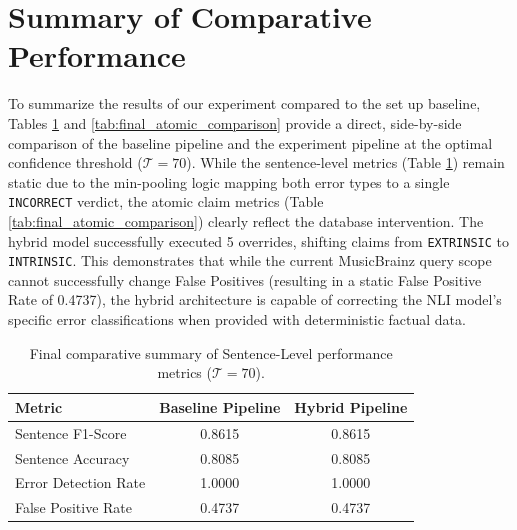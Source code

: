 \section{Summary of Comparative Performance}
To summarize the results of our experiment compared to the set up baseline, Tables \ref{tab:final_sentence_comparison} and \ref{tab:final_atomic_comparison} provide a direct, side-by-side comparison of the baseline pipeline and the experiment pipeline at the optimal confidence threshold ($\mathcal{T} = 70$). While the sentence-level metrics (Table \ref{tab:final_sentence_comparison}) remain static due to the min-pooling logic mapping both error types to a single \texttt{INCORRECT} verdict, the atomic claim metrics (Table \ref{tab:final_atomic_comparison}) clearly reflect the database intervention. The hybrid model successfully executed 5 overrides, shifting claims from \texttt{EXTRINSIC} to \texttt{INTRINSIC}. This demonstrates that while the current MusicBrainz query scope cannot successfully change False Positives (resulting in a static False Positive Rate of 0.4737), the hybrid architecture is capable of correcting the NLI model's specific error classifications when provided with deterministic factual data.

\begin{table}[htbp]
    \centering
    \caption{Final comparative summary of Sentence-Level performance metrics ($\mathcal{T} = 70$).}
    \label{tab:final_sentence_comparison}
    \renewcommand{\arraystretch}{1.2}
    \begin{tabular}{l c c}
        \toprule
        \textbf{Metric} & \textbf{Baseline Pipeline} & \textbf{Hybrid Pipeline} \\
        \midrule
        Sentence F1-Score & 0.8615 & 0.8615 \\
        Sentence Accuracy & 0.8085 & 0.8085 \\
        Error Detection Rate & 1.0000 & 1.0000 \\
        False Positive Rate & 0.4737 & 0.4737 \\
        \bottomrule
    \end{tabular}
\end{table}

